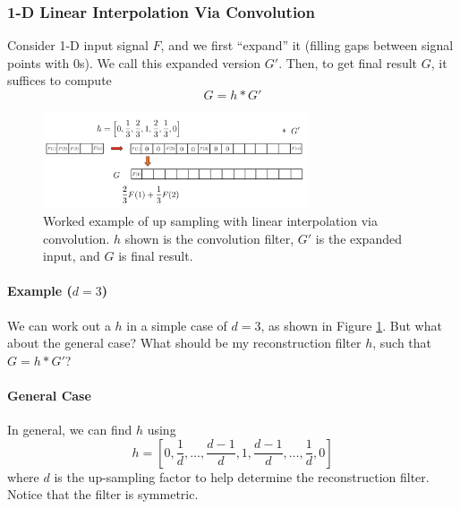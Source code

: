 \documentclass[11pt]{article}
\begin{document}
\subsubsection{1-D Linear Interpolation Via Convolution}
Consider 1-D input signal $F$, and we first ``expand'' it (filling gaps between signal points with 0s). We call this expanded version $G'$. Then, to get final result $G$, it suffices to compute
\begin{equation}
	G = h \ast G'
\end{equation}

\begin{figure}[H]
	\center\includegraphics[width=0.7\textwidth]{figs/up_sample_conv}
	\caption{Worked example of up sampling with linear interpolation via convolution. $h$ shown is the convolution filter, $G'$ is the expanded input, and $G$ is final result. \label{fig:up_sample_conv}}
\end{figure}

\paragraph{Example ($d = 3$)} We can work out a $h$ in a simple case of $d = 3$, as shown in Figure \ref{fig:up_sample_conv}. But what about the general case? What should be my reconstruction filter $h$, such that $G = h \ast G'$?

\paragraph{General Case} In general, we can find $h$ using
\begin{equation}
	h=\left[0, \frac{1}{d}, \ldots, \frac{d-1}{d}, 1, \frac{d-1}{d}, \ldots, \frac{1}{d}, 0\right]
\end{equation}
where $d$ is the up-sampling factor to help determine the reconstruction filter. Notice that the filter is symmetric. 
\end{document}
